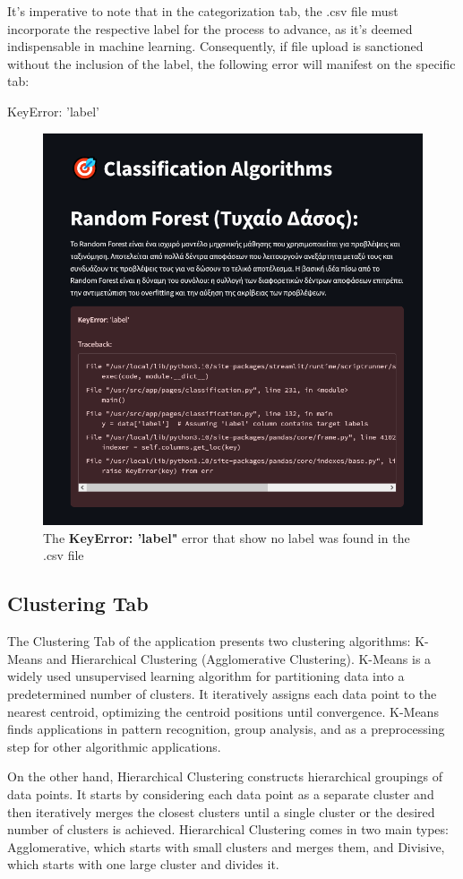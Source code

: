 \documentclass[unnumsec,webpdf,contemporary,large]{oup-authoring-template}%
\theoremstyle{thmstyleone}%
\theoremstyle{thmstyletwo}%
\theoremstyle{thmstylethree}%
\begin{document}
It's imperative to note that in the categorization tab, the .csv file must incorporate the respective label for the process to advance, as it's deemed indispensable in machine learning. Consequently, if file upload is sanctioned without the inclusion of the label, the following error will manifest on the specific tab:

KeyError: 'label'

\begin{figure}
    \centering
    \includegraphics[width=0.4\linewidth]{images/error-classification.png}
    \caption{The \textbf{KeyError: 'label"} error that show no label was found in the .csv file}
    \label{fig:error-classification}
\end{figure}

\subsection{\textbf{Clustering Tab}}
\vspace{0.2cm}

The Clustering Tab of the application presents two clustering algorithms: K-Means and Hierarchical Clustering (Agglomerative Clustering). K-Means is a widely used unsupervised learning algorithm for partitioning data into a predetermined number of clusters. It iteratively assigns each data point to the nearest centroid, optimizing the centroid positions until convergence. K-Means finds applications in pattern recognition, group analysis, and as a preprocessing step for other algorithmic applications. 
\vspace{0.2cm}

On the other hand, Hierarchical Clustering constructs hierarchical groupings of data points. It starts by considering each data point as a separate cluster and then iteratively merges the closest clusters until a single cluster or the desired number of clusters is achieved. Hierarchical Clustering comes in two main types: Agglomerative, which starts with small clusters and merges them, and Divisive, which starts with one large cluster and divides it. 
\vspace{0.2cm}
\end{document}
